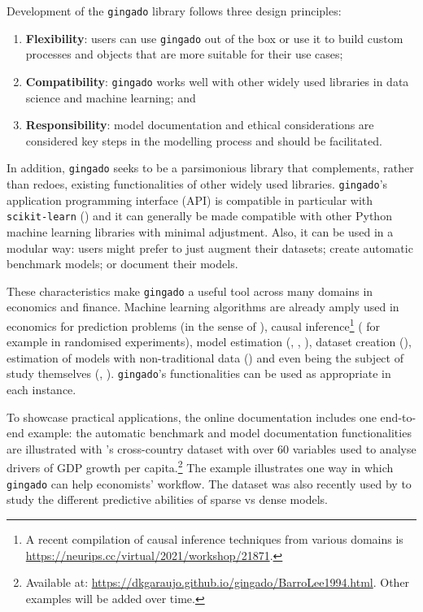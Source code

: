 \documentclass{article}
\begin{document}
Development of the \texttt{gingado} library follows three design principles:
\begin{enumerate}
    \item \textbf{Flexibility}: users can use \texttt{gingado} out of the box or use it to build custom processes and objects that are more suitable for their use cases;
    \item \textbf{Compatibility}: \texttt{gingado} works well with other widely used libraries in data science and machine learning; and
    \item \textbf{Responsibility}: model documentation and ethical considerations are considered key steps in the modelling process and should be facilitated.
\end{enumerate}
In addition, \texttt{gingado} seeks to be a parsimonious library that complements, rather than redoes, existing functionalities of other widely used libraries. \texttt{gingado}'s application programming interface (API) is compatible in particular with \texttt{scikit-learn} (\cite{scikit-learn}) and it can generally be made compatible with other Python machine learning libraries with minimal adjustment. Also, it can be used in a modular way: users might prefer to just augment their datasets; create automatic benchmark models; or document their models.

These characteristics make \texttt{gingado} a useful tool across many domains in economics and finance. Machine learning algorithms are already amply used in economics for prediction problems (in the sense of \cite{PredictionProblems}), causal inference\footnote{A recent compilation of causal inference techniques from various domains is \url{https://neurips.cc/virtual/2021/workshop/21871}.} (\cite{chernozhukov2018generic} for example in randomised experiments), model estimation (\cite{maliar2021deep}, \cite{fernandez2019financial}, \cite{duarte2018machine}), dataset creation (\cite{Folklore}), estimation of models with non-traditional data (\cite{ferreira2021forecasting}) and even being the subject of study themselves (\cite{predunequal}, \cite{giannone2021illusion}). \texttt{gingado}'s functionalities can be used as appropriate in each instance.

To showcase practical applications, the online documentation includes one end-to-end example: the automatic benchmark and model documentation functionalities are illustrated with \cite{BARRO19941}'s cross-country dataset with over 60 variables used to analyse drivers of GDP growth per capita.\footnote{Available at: \url{https://dkgaraujo.github.io/gingado/BarroLee1994.html}. Other examples will be added over time.} The example illustrates one way in which \texttt{gingado} can help economists' workflow. The dataset was also recently used by \cite{giannone2021illusion} to study the different predictive abilities of sparse vs dense models.
\end{document}
